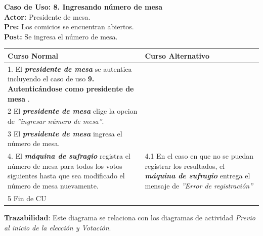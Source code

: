 \documentclass[spanish, 10pt,a4paper]{article}
\numberwithin{equation}{section} %
\begin{document}
\noindent\textbf{Caso de Uso: 8. Ingresando número de mesa}\\
\textbf{Actor: } Presidente de mesa.\\
\textbf{Pre: } Los comicios se encuentran abiertos.\\
\textbf{Post: } Se ingresa el número de mesa.\\
\begin{table}[H]
  \centering
\bgroup
\def\arraystretch{1.3}
  \begin{tabular}{p{9cm} | p{7cm}}
    \hline
    Curso Normal & Curso Alternativo \\
    \hline
    \hline    
    1. El \textbf{\textit{presidente de mesa}} se autentica incluyendo el caso de uso \textbf{ 9. Autenticándose como presidente de mesa} . 
    & \\
    
    \hline
    2 El \textbf{\textit{presidente de mesa}} elige la opcion de \textit{''ingresar número de mesa''}.
    & \\
    
    \hline
    3 El \textbf{\textit{presidente de mesa}} ingresa el número de mesa.
    \\
    
    \hline
    4. El \textbf{\textit{máquina de sufragio}} registra el número de mesa para todos los votos siguientes hasta que sea modificado el número de mesa nuevamente.
    &
    4.1 En el caso en que no se puedan registrar los resultados, el \textbf{\textit{máquina de sufragio}} entrega el mensaje de \textit{''Error de registración''}
    \\
    
    \hline
    5 Fin de CU
    & \\
    \hline
  \end{tabular}
\egroup
\end{table}
\vspace{-10px}
\noindent\textbf{Trazabilidad}: Este diagrama se relaciona con los diagramas de actividad \textit{Previo al inicio de la elección y Votación}.\\
\end{document}
